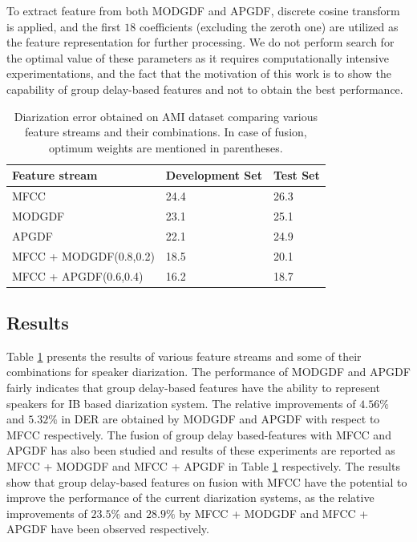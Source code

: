 \documentclass[conference]{IEEEtran}
\begin{document}
To extract feature from both MODGDF and APGDF, discrete cosine transform is applied, and the first $18$ coefficients (excluding the zeroth one) are utilized as the feature representation for further processing. 
We do not perform search for the optimal value of these parameters as it requires computationally intensive experimentations, and the fact that the motivation of this work is to show the capability of group delay-based features and not to obtain the best performance. 

\begin{table}[h]
\centering
\label{my-label}
\begin{tabular}{|l|l|l|}
\hline
Feature stream  & Development Set & Test Set \\ \hline
MFCC          & 24.4                   & 26.3            \\ \hline
MODGDF        & 23.1                   & 25.1            \\ \hline
APGDF         & 22.1                   & 24.9            \\ \hline
MFCC + MODGDF(0.8,0.2) & 18.5          & 20.1            \\ \hline
MFCC + APGDF(0.6,0.4)  & 16.2          & 18.7            \\ \hline
\end{tabular}
\vspace{0.4cm}
\label{table:results}
\caption{Diarization error obtained on AMI dataset comparing various feature
streams and their combinations. In case of fusion, optimum weights are mentioned
in parentheses.}
\end{table}


\subsection{Results}

Table \ref{table:results} presents the results of various feature streams and some of their
combinations for speaker diarization. The performance of MODGDF and APGDF
fairly indicates that group delay-based features have the ability to represent
speakers for IB based diarization system. The relative improvements
of $4.56\%$ and $5.32\%$ in DER are obtained by MODGDF and APGDF with respect to MFCC
respectively. The fusion of group delay based-features with MFCC and APGDF has also been
studied and results of these experiments are reported as MFCC + MODGDF and MFCC + APGDF in Table \ref{table:results} respectively. The results show that group delay-based features on fusion with MFCC have the potential to improve the performance of the current diarization systems, as the relative improvements of $23.5\%$ and $28.9\%$ by MFCC + MODGDF and MFCC + APGDF have been observed respectively.
\end{document}
